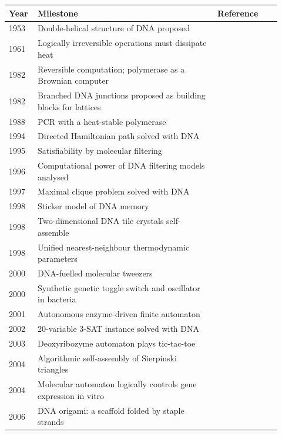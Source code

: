 \begin{center}
\small
\begin{longtable}{@{}p{0.08\linewidth}p{0.62\linewidth}p{0.22\linewidth}@{}}
\toprule
Year & Milestone & Reference\\
\midrule
\endhead
1953 & Double-helical structure of DNA proposed & \cite{WatsonCrick1953}\\
1961 & Logically irreversible operations must dissipate heat & \cite{Landauer1961}\\
1982 & Reversible computation; polymerase as a Brownian computer & \cite{Bennett1982}\\
1982 & Branched DNA junctions proposed as building blocks for lattices & \cite{Seeman1982}\\
1988 & PCR with a heat-stable polymerase & \cite{Saiki1988}\\
1994 & Directed Hamiltonian path solved with DNA & \cite{Adleman1994}\\
1995 & Satisfiability by molecular filtering & \cite{Lipton1995}\\
1996 & Computational power of DNA filtering models analysed & \cite{Boneh1996}\\
1997 & Maximal clique problem solved with DNA & \cite{Ouyang1997}\\
1998 & Sticker model of DNA memory & \cite{Roweis1998}\\
1998 & Two-dimensional DNA tile crystals self-assemble & \cite{Winfree1998}\\
1998 & Unified nearest-neighbour thermodynamic parameters & \cite{SantaLucia1998}\\
2000 & DNA-fuelled molecular tweezers & \cite{Yurke2000}\\
2000 & Synthetic genetic toggle switch and oscillator in bacteria & \cite{Gardner2000,ElowitzLeibler2000}\\
2001 & Autonomous enzyme-driven finite automaton & \cite{Benenson2001}\\
2002 & 20-variable 3-SAT instance solved with DNA & \cite{Braich2002}\\
2003 & Deoxyribozyme automaton plays tic-tac-toe & \cite{Stojanovic2003}\\
2004 & Algorithmic self-assembly of Sierpinski triangles & \cite{Rothemund2004}\\
2004 & Molecular automaton logically controls gene expression in vitro & \cite{Benenson2004}\\
2006 & DNA origami: a scaffold folded by staple strands & \cite{Rothemund2006}\\

\end{longtable}
\end{center}
